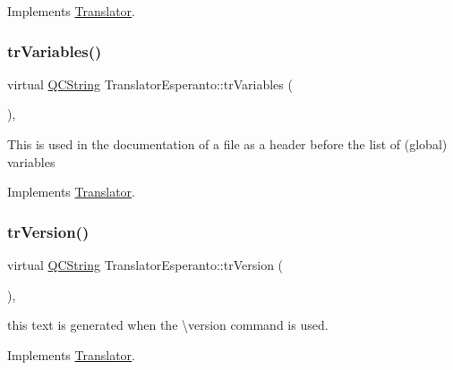 Implements \mbox{\hyperlink{class_translator}{Translator}}.

\mbox{\label{class_translator_esperanto_a77cae50e36d73971334f4a7cd410a3fe}} 
\subsubsection{\texorpdfstring{trVariables()}{trVariables()}}
{\footnotesize\ttfamily virtual \mbox{\hyperlink{class_q_c_string}{Q\+C\+String}} Translator\+Esperanto\+::tr\+Variables (\begin{DoxyParamCaption}{ }\end{DoxyParamCaption})\hspace{0.3cm}{\ttfamily [inline]}, {\ttfamily [virtual]}}

This is used in the documentation of a file as a header before the list of (global) variables 

Implements \mbox{\hyperlink{class_translator}{Translator}}.

\mbox{\label{class_translator_esperanto_ab1a9b9428bee02a9063968208f02c6fd}} 
\subsubsection{\texorpdfstring{trVersion()}{trVersion()}}
{\footnotesize\ttfamily virtual \mbox{\hyperlink{class_q_c_string}{Q\+C\+String}} Translator\+Esperanto\+::tr\+Version (\begin{DoxyParamCaption}{ }\end{DoxyParamCaption})\hspace{0.3cm}{\ttfamily [inline]}, {\ttfamily [virtual]}}

this text is generated when the \textbackslash{}version command is used. 

Implements \mbox{\hyperlink{class_translator}{Translator}}.

\mbox{\label{class_translator_esperanto_abc40b1a2f2da32686ea72d3ed27fba6b}} 
